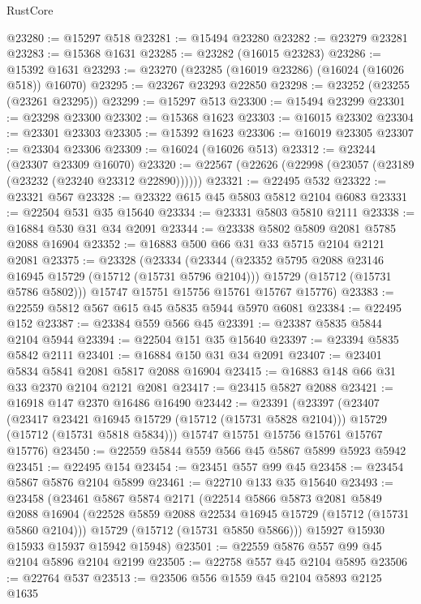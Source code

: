 \begin{lexlean}{RustCore}
\begin{coremodule}
@23280 := @15297 @518
@23281 := @15494 @23280
@23282 := @23279 @23281
@23283 := @15368 @1631
@23285 := @23282 (@16015 @23283)
@23286 := @15392 @1631
@23293 := @23270 (@23285 (@16019 @23286) (@16024 (@16026 @518)) @16070)
@23295 := @23267 @23293 @22850
@23298 := @23252 (@23255 (@23261 @23295))
@23299 := @15297 @513
@23300 := @15494 @23299
@23301 := @23298 @23300
@23302 := @15368 @1623
@23303 := @16015 @23302
@23304 := @23301 @23303
@23305 := @15392 @1623
@23306 := @16019 @23305
@23307 := @23304 @23306
@23309 := @16024 (@16026 @513)
@23312 := @23244 (@23307 @23309 @16070)
@23320 := @22567 (@22626 (@22998 (@23057 (@23189 (@23232 (@23240 @23312 @22890))))))
@23321 := @22495 @532
@23322 := @23321 @567
@23328 := @23322 @615 @45 @5803 @5812 @2104 @6083
@23331 := @22504 @531 @35 @15640
@23334 := @23331 @5803 @5810 @2111
@23338 := @16884 @530 @31 @34 @2091
@23344 := @23338 @5802 @5809 @2081 @5785 @2088 @16904
@23352 := @16883 @500 @66 @31 @33 @5715 @2104 @2121 @2081
@23375 := @23328
    (@23334
      (@23344
        (@23352 @5795 @2088 @23146 @16945 @15729 (@15712 (@15731 @5796 @2104)))
        @15729
        (@15712 (@15731 @5786 @5802)))
      @15747
      @15751
      @15756
      @15761
      @15767
      @15776)
@23383 := @22559 @5812 @567 @615 @45 @5835 @5944 @5970 @6081
@23384 := @22495 @152
@23387 := @23384 @559 @566 @45
@23391 := @23387 @5835 @5844 @2104 @5944
@23394 := @22504 @151 @35 @15640
@23397 := @23394 @5835 @5842 @2111
@23401 := @16884 @150 @31 @34 @2091
@23407 := @23401 @5834 @5841 @2081 @5817 @2088 @16904
@23415 := @16883 @148 @66 @31 @33 @2370 @2104 @2121 @2081
@23417 := @23415 @5827 @2088
@23421 := @16918 @147 @2370 @16486 @16490
@23442 := @23391
    (@23397
      (@23407
        (@23417 @23421 @16945 @15729 (@15712 (@15731 @5828 @2104)))
        @15729
        (@15712 (@15731 @5818 @5834)))
      @15747
      @15751
      @15756
      @15761
      @15767
      @15776)
@23450 := @22559 @5844 @559 @566 @45 @5867 @5899 @5923 @5942
@23451 := @22495 @154
@23454 := @23451 @557 @99 @45
@23458 := @23454 @5867 @5876 @2104 @5899
@23461 := @22710 @133 @35 @15640
@23493 := @23458
    (@23461
      @5867
      @5874
      @2171
      (@22514
        @5866
        @5873
        @2081
        @5849
        @2088
        @16904
        (@22528 @5859 @2088 @22534 @16945 @15729 (@15712 (@15731 @5860 @2104)))
        @15729
        (@15712 (@15731 @5850 @5866)))
      @15927
      @15930
      @15933
      @15937
      @15942
      @15948)
@23501 := @22559 @5876 @557 @99 @45 @2104 @5896 @2104 @2199
@23505 := @22758 @557 @45 @2104 @5895
@23506 := @22764 @537
@23513 := @23506 @556 @1559 @45 @2104 @5893 @2125 @1635

\end{coremodule}
\end{lexlean}
